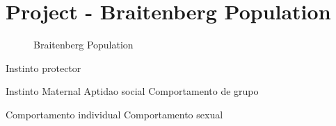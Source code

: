 \documentclass[a4paper]{article}
\begin{document}
\cleardoublepage
\section{Project - Braitenberg Population}
\begin{figure}[h]
	\centering
	\hspace{5px}
	\hspace{5px}

	\caption{Braitenberg Population}
\end{figure}

Instinto protector

Instinto Maternal
Aptidao social
Comportamento de grupo 

Comportamento individual
Comportamento sexual
\end{document}
